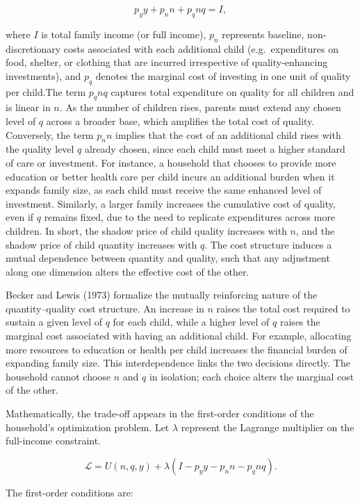 \documentclass[]{AEA}
\begin{document}
\[
p_y y + p_n n + p_q n q = I,
\]

where \(I\) is total family income (or full income), \(p_n\) represents
baseline, non-discretionary costs associated with each additional child
(e.g.~expenditures on food, shelter, or clothing that are incurred
irrespective of quality-enhancing investments), and \(p_q\) denotes the
marginal cost of investing in one unit of quality per child.The term
\(p_q n q\) captures total expenditure on quality for all children and
is linear in \(n\). As the number of children rises, parents must extend
any chosen level of \(q\) across a broader base, which amplifies the
total cost of quality. Conversely, the term \(p_n n\) implies that the
cost of an additional child rises with the quality level \(q\) already
chosen, since each child must meet a higher standard of care or
investment. For instance, a household that chooses to provide more
education or better health care per child incurs an additional burden
when it expands family size, as each child must receive the same
enhanced level of investment. Similarly, a larger family increases the
cumulative cost of quality, even if \(q\) remains fixed, due to the need
to replicate expenditures across more children. In short, the shadow
price of child quality increases with \(n\), and the shadow price of
child quantity increases with \(q\). The cost structure induces a mutual
dependence between quantity and quality, such that any adjustment along
one dimension alters the effective cost of the other.

Becker and Lewis (1973) formalize the mutually reinforcing nature of the
quantity--quality cost structure. An increase in \(n\) raises the total
cost required to sustain a given level of \(q\) for each child, while a
higher level of \(q\) raises the marginal cost associated with having an
additional child. For example, allocating more resources to education or
health per child increases the financial burden of expanding family
size. This interdependence links the two decisions directly. The
household cannot choose \(n\) and \(q\) in isolation; each choice alters
the marginal cost of the other.

Mathematically, the trade-off appears in the first-order conditions of
the household's optimization problem. Let \(\lambda\) represent the
Lagrange multiplier on the full-income constraint.

\[
\mathcal{L} = U(n, q, y) + \lambda \left( I - p_y y - p_n n - p_q n q \right).
\]

The first-order conditions are:
\end{document}
